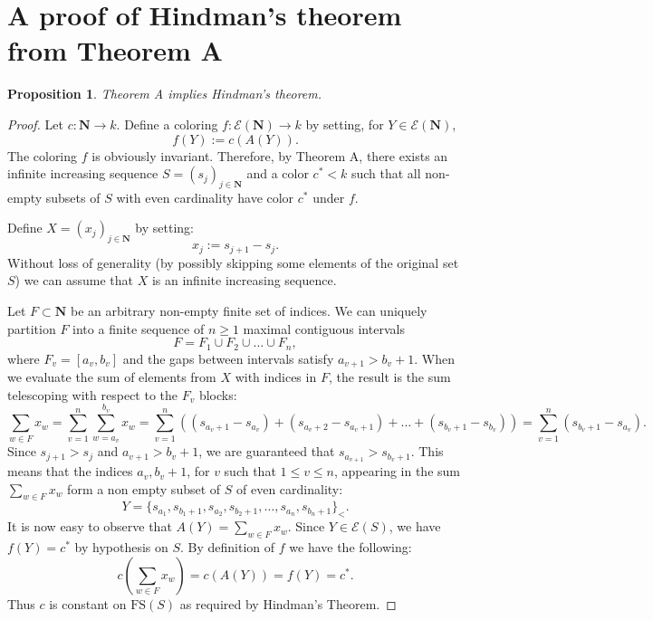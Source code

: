 \documentclass[11pt]{amsart}
\newcommand{\Nat}{\mathbf{N}}
\newcommand{\FS}{\mathrm{FS}}
\newtheorem{proposition}{Proposition}[section]
\theoremstyle{definition}
\begin{document}
\section{A proof of Hindman's theorem from Theorem A}

\begin{proposition}\label{prop:AtoHT}
Theorem A implies Hindman's theorem.
\end{proposition}

\begin{proof}
Let $c: \Nat \to k$. Define a coloring $f: \mathcal{E}(\Nat) \to k$ by setting, for $Y \in \mathcal{E}(\Nat)$,
    $$f(Y) := c(A(Y)).$$
The coloring $f$ is obviously invariant. Therefore, by Theorem A, there exists an infinite increasing sequence $S = (s_j)_{j \in \Nat}$ and a color $c^*<k$ such that all non-empty subsets of $S$ with even cardinality have color $c^*$ under $f$. 

Define $X = (x_j)_{j \in \Nat}$ by setting:
    $$x_j := s_{j+1} - s_j.$$
Without loss of generality (by possibly skipping some elements of the original set $S$) we can assume that $X$ is an infinite increasing sequence.

Let $F \subset \Nat$ be an arbitrary non-empty finite set of indices. We can uniquely partition $F$ into a finite sequence of $n\geq 1$ maximal contiguous intervals
    $$F = F_1 \cup F_2 \cup \dots \cup F_n,$$
    where $F_v = [a_v, b_v]$ and the gaps between intervals satisfy $a_{v+1} > b_v + 1$. When we evaluate the sum of elements from $X$ with indices in $F$, the result is the sum telescoping with respect to the $F_v$ blocks:
    $$\sum_{w \in F} x_w = \sum_{v=1}^n \sum_{w=a_v}^{b_v} x_w = \sum_{v=1}^{n}\left((s_{a_v+1}-s_{a_v})+(s_{a_v+2}-s_{a_v+1})+\dots+(s_{b_v+1}-s_{b_v})\right) =\sum_{v=1}^n (s_{b_v+1}-s_{a_v}).$$
    Since $s_{j+1} > s_j$ and $a_{v+1} > b_v + 1$, we are guaranteed that $s_{a_{v+1}} > s_{b_v+1}$. This means that the indices $a_v,b_v+1$, for $v$ such that $1\leq v \leq n$, appearing in the sum $\sum_{w \in F}x_w$ form a non empty subset of $S$ of even cardinality:
    $$Y = \{s_{a_1}, s_{b_1+1}, s_{a_2}, s_{b_2+1}, \dots, s_{a_n}, s_{b_n+1}\}_<.$$
    It is now easy to observe that $A(Y)=\sum_{w \in F}x_w$. Since $Y \in \mathcal{E}(S)$, we have $f(Y) = c^*$ by hypothesis on $S$. By definition of $f$ we have the following:
$$c\left(\sum_{w \in F} x_w\right) = c(A(Y)) = f(Y) = c^*.$$
    Thus $c$ is constant on $\FS(S)$ as required by Hindman's Theorem.

\end{proof}
\end{document}
